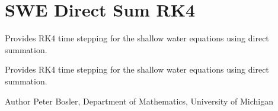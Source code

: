 \hypertarget{group__SWEDirectSum}{\section{S\+W\+E Direct Sum R\+K4}
\label{group__SWEDirectSum}
}


Provides R\+K4 time stepping for the shallow water equations using direct summation.  


Provides R\+K4 time stepping for the shallow water equations using direct summation. 

\begin{DoxyAuthor}{Author}
Peter Bosler, Department of Mathematics, University of Michigan 
\end{DoxyAuthor}
